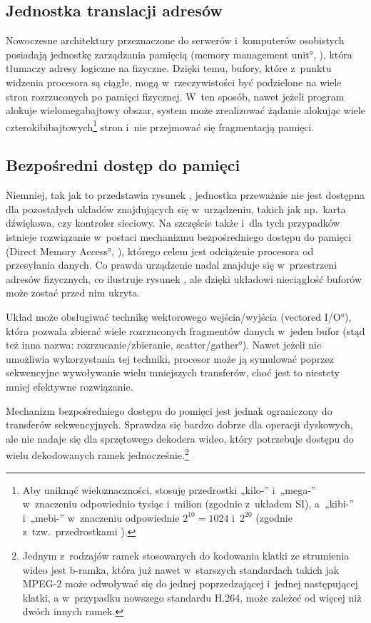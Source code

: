 \subsection{Jednostka translacji adresów}

Nowoczesne architektury przeznaczone do serwerów i~komputerów
osobistych posiadają jednostkę zarządzania pamięcią (\ang{memory
  management unit}, ), która tłumaczy adresy logiczne na
fizyczne.  Dzięki temu, bufory, które z~punktu widzenia procesora są
ciągłe, mogą w~rzeczywistości być podzielone na wiele stron
rozrzuconych po pamięci fizycznej.  W~ten sposób, nawet jeżeli program
alokuje wielomegabajtowy obszar, system może zrealizować żądanie
alokując wiele czterokibibajtowych\footnote{Aby uniknąć
  wieloznaczności, stosuję przedrostki „kilo-” i~„mega-” w~znaczeniu
  odpowiednio tysiąc i~milion (zgodnie z~układem SI), a~„kibi-”
  i~„mebi-” w~znaczeniu odpowiednie $2^{10} = 1024$ i~$2^{20}$
  (zgodnie z~tzw.\ przedrostkami ).} stron i~nie przejmować się
fragmentacją pamięci.

\subsection{Bezpośredni dostęp do pamięci}

Niemniej, tak jak to przedstawia rysunek ,
jednostka  przeważnie nie jest dostępna dla pozostałych układów
znajdujących się w~urządzeniu, takich jak np.\ karta dźwiękowa, czy
kontroler sieciowy.  Na szczęście także i~dla tych przypadków istnieje
rozwiązanie w~postaci mechanizmu bezpośredniego dostępu do pamięci
(\ang{Direct Memory Access}, ), którego celem jest odciążenie
procesora od przesyłania danych.  Co prawda urządzenie nadal znajduje
się w~przestrzeni adresów fizycznych, co ilustruje rysunek
, ale dzięki układowi  nieciągłość
buforów może zostać przed nim ukryta.

Układ  może obsługiwać technikę wektorowego wejścia/wyjścia
(\ang{vectored I/O}), która pozwala zbierać wiele rozrzuconych
fragmentów danych w~jeden bufor (stąd też inna nazwa:
rozrzucanie/zbieranie, \ang{scatter/gather}).  Nawet jeżeli  nie
umożliwia wykorzystania tej techniki, procesor może ją symulować
poprzez sekwencyjne wywoływanie wielu mniejszych transferów, choć jest
to niestety mniej efektywne rozwiązanie.

Mechanizm bezpośredniego dostępu do pomięci jest jednak ograniczony do
transferów sekwencyjnych.  Sprawdza się bardzo dobrze dla operacji
dyskowych, ale nie nadaje się dla sprzętowego dekodera wideo, który
potrzebuje dostępu do wielu dekodowanych ramek
jednocześnie.\footnote{Jednym z~rodzajów ramek stosowanych do
  kodowania klatki ze strumienia wideo jest b-ramka, która już nawet
  w~starszych standardach takich jak MPEG-2 może odwoływać się do
  jednej poprzedzającej i~jednej następującej klatki, a w~przypadku
  nowszego standardu H.264, może zależeć od więcej niż dwóch innych
  ramek.}

